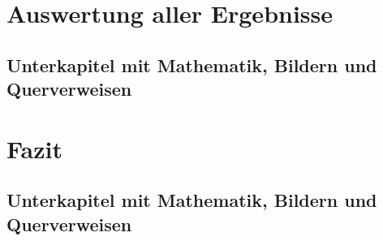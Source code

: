 \chapter{Auswertung aller Ergebnisse}

\section{Unterkapitel mit Mathematik, Bildern und Querverweisen}

\chapter{Fazit}

\section{Unterkapitel mit Mathematik, Bildern und Querverweisen}






\listoffigures %
\listoftables %


